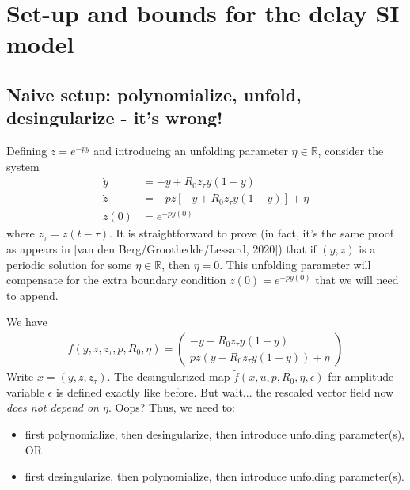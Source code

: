 \documentclass[10pt]{article}
\newcommand{\R}{\mathbb{R}}
\begin{document}
\section{Set-up and bounds for the delay SI model}
\subsection{Naive setup: polynomialize, unfold, desingularize - it's wrong!}
Defining $z=e^{-py}$ and introducing an unfolding parameter $\eta\in\R$, consider the system
\begin{align*}
\dot y&=-y + R_0z_\tau y(1-y)\\
\dot z&=-pz[-y+R_0z_\tau y(1-y)] + \eta\\
z(0)&=e^{-py(0)}
\end{align*}
where $z_\tau=z(t-\tau)$. It is straightforward to prove (in fact, it's the same proof as appears in [van den Berg/Groothedde/Lessard, 2020]) that if $(y,z)$ is a periodic solution for some $\eta\in\R$, then $\eta=0$. This unfolding parameter will compensate for the extra boundary condition $z(0)=e^{-py(0)}$ that we will need to append.

We have
\begin{align*}
f(y,z,z_\tau,p,R_0,\eta)=\left(\begin{array}{c}-y+R_0z_\tau y(1-y) \\ pz(y-R_0z_\tau y(1-y)) + \eta \end{array}\right)
\end{align*}
Write $x=(y,z,z_\tau)$. The desingularized map $\tilde f(x,u,p,R_0,\eta,\epsilon)$ for amplitude variable $\epsilon$ is defined exactly like before. But wait... the rescaled vector field now \emph{does not depend on $\eta$}. Oops? Thus, we need to:
\begin{itemize}
\item first polynomialize, then desingularize, then introduce unfolding parameter(s), OR
\item first desingularize, then polynomialize, then introduce unfolding parameter(s).
\end{itemize}
\end{document}
